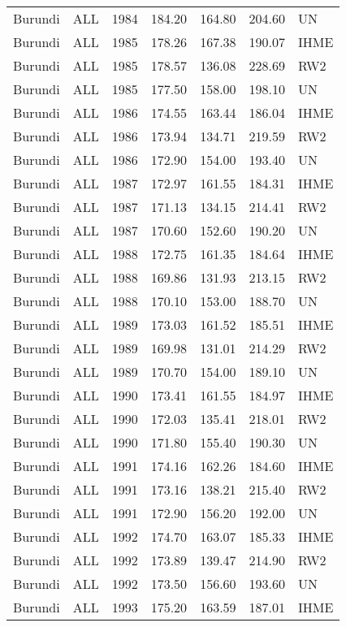 \begin{longtable}{lllrrrl}
  Burundi & ALL & 1984 & 184.20 & 164.80 & 204.60 & UN \\ 
  Burundi & ALL & 1985 & 178.26 & 167.38 & 190.07 & IHME \\ 
  Burundi & ALL & 1985 & 178.57 & 136.08 & 228.69 & RW2 \\ 
  Burundi & ALL & 1985 & 177.50 & 158.00 & 198.10 & UN \\ 
  Burundi & ALL & 1986 & 174.55 & 163.44 & 186.04 & IHME \\ 
  Burundi & ALL & 1986 & 173.94 & 134.71 & 219.59 & RW2 \\ 
  Burundi & ALL & 1986 & 172.90 & 154.00 & 193.40 & UN \\ 
  Burundi & ALL & 1987 & 172.97 & 161.55 & 184.31 & IHME \\ 
  Burundi & ALL & 1987 & 171.13 & 134.15 & 214.41 & RW2 \\ 
  Burundi & ALL & 1987 & 170.60 & 152.60 & 190.20 & UN \\ 
  Burundi & ALL & 1988 & 172.75 & 161.35 & 184.64 & IHME \\ 
  Burundi & ALL & 1988 & 169.86 & 131.93 & 213.15 & RW2 \\ 
  Burundi & ALL & 1988 & 170.10 & 153.00 & 188.70 & UN \\ 
  Burundi & ALL & 1989 & 173.03 & 161.52 & 185.51 & IHME \\ 
  Burundi & ALL & 1989 & 169.98 & 131.01 & 214.29 & RW2 \\ 
  Burundi & ALL & 1989 & 170.70 & 154.00 & 189.10 & UN \\ 
  Burundi & ALL & 1990 & 173.41 & 161.55 & 184.97 & IHME \\ 
  Burundi & ALL & 1990 & 172.03 & 135.41 & 218.01 & RW2 \\ 
  Burundi & ALL & 1990 & 171.80 & 155.40 & 190.30 & UN \\ 
  Burundi & ALL & 1991 & 174.16 & 162.26 & 184.60 & IHME \\ 
  Burundi & ALL & 1991 & 173.16 & 138.21 & 215.40 & RW2 \\ 
  Burundi & ALL & 1991 & 172.90 & 156.20 & 192.00 & UN \\ 
  Burundi & ALL & 1992 & 174.70 & 163.07 & 185.33 & IHME \\ 
  Burundi & ALL & 1992 & 173.89 & 139.47 & 214.90 & RW2 \\ 
  Burundi & ALL & 1992 & 173.50 & 156.60 & 193.60 & UN \\ 
  Burundi & ALL & 1993 & 175.20 & 163.59 & 187.01 & IHME \\ 

\end{longtable}
